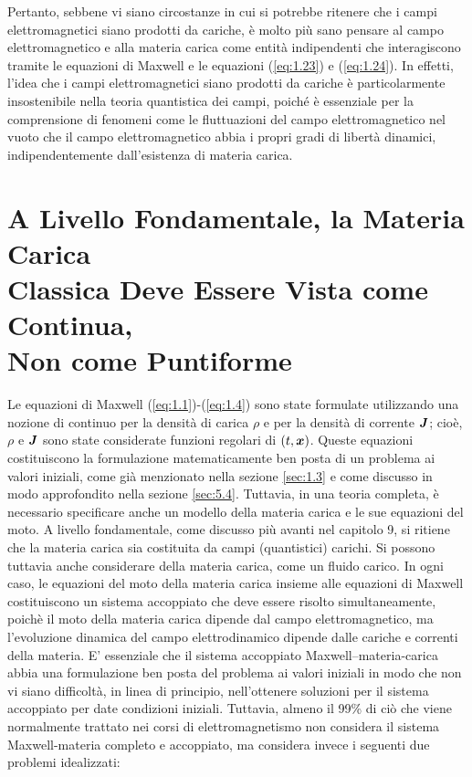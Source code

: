 Pertanto, sebbene vi siano circostanze in cui si potrebbe ritenere che i campi elettromagnetici siano prodotti da cariche, è molto più sano pensare al campo elettromagnetico e alla materia carica come entità indipendenti che interagiscono tramite le equazioni di Maxwell e le equazioni (\ref{eq:1.23}) e (\ref{eq:1.24}). In effetti, l'idea che i campi elettromagnetici siano prodotti da cariche è particolarmente insostenibile nella teoria quantistica dei campi, poiché è essenziale per la comprensione di fenomeni come le fluttuazioni del campo elettromagnetico nel vuoto che il campo elettromagnetico abbia i propri gradi di libertà dinamici, indipendentemente dall'esistenza di materia carica.

\section[Materia Carica come un Continuo]{A Livello Fondamentale, la Materia Carica \\Classica Deve Essere Vista come Continua, \\Non come Puntiforme}\label{sec:1.4}

Le equazioni di Maxwell (\ref{eq:1.1})-(\ref{eq:1.4}) sono state formulate utilizzando una nozione di continuo per la densità di carica $\rho$ e per la densità di corrente $\vb*{J}$; cioè, $\rho$ e  $\vb*{J}$ sono state considerate funzioni regolari di $(t, \vb*{x})$. Queste equazioni costituiscono la formulazione matematicamente ben posta di un problema ai valori iniziali, come già menzionato nella sezione \ref{sec:1.3} e come discusso in modo approfondito nella sezione \ref{sec:5.4}. Tuttavia, in una teoria completa, è necessario specificare anche un modello della materia carica e le sue equazioni del moto. A livello fondamentale, come discusso più avanti nel capitolo 9, si ritiene che la materia carica sia costituita da campi (quantistici) carichi.  Si possono tuttavia anche considerare  della materia carica, come un fluido carico. In ogni caso, le equazioni del moto della materia carica insieme alle equazioni di Maxwell costituiscono un sistema accoppiato che deve essere risolto simultaneamente, poichè il moto della materia carica dipende dal campo elettromagnetico, ma l'evoluzione dinamica del campo elettrodinamico dipende dalle cariche e correnti della materia. E' essenziale che il sistema accoppiato Maxwell--materia-carica abbia una formulazione ben posta del problema ai valori iniziali in modo che non vi siano difficoltà, in linea di principio, nell'ottenere soluzioni per il sistema accoppiato per date condizioni iniziali. Tuttavia, almeno il 99\% di ciò che viene normalmente trattato nei corsi di elettromagnetismo non considera il sistema Maxwell-materia completo e accoppiato, ma considera invece i seguenti due problemi idealizzati:

